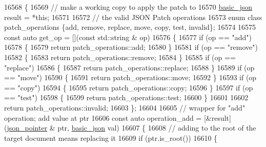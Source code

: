 \begin{DoxyCode}
16568     \{
16569         \textcolor{comment}{// make a working copy to apply the patch to}
16570         \hyperlink{classnlohmann_1_1basic__json_aed115142bd0c6c66c864700e0467df55}{basic\_json} result = *\textcolor{keyword}{this};
16571 
16572         \textcolor{comment}{// the valid JSON Patch operations}
16573         \textcolor{keyword}{enum class} patch\_operations \{add, \textcolor{keyword}{remove}, replace, move, copy, test, invalid\};
16574 
16575         \textcolor{keyword}{const} \textcolor{keyword}{auto} get\_op = [](\textcolor{keyword}{const} std::string & op)
16576         \{
16577             \textcolor{keywordflow}{if} (op == \textcolor{stringliteral}{"add"})
16578             \{
16579                 \textcolor{keywordflow}{return} patch\_operations::add;
16580             \}
16581             \textcolor{keywordflow}{if} (op == \textcolor{stringliteral}{"remove"})
16582             \{
16583                 \textcolor{keywordflow}{return} patch\_operations::remove;
16584             \}
16585             \textcolor{keywordflow}{if} (op == \textcolor{stringliteral}{"replace"})
16586             \{
16587                 \textcolor{keywordflow}{return} patch\_operations::replace;
16588             \}
16589             \textcolor{keywordflow}{if} (op == \textcolor{stringliteral}{"move"})
16590             \{
16591                 \textcolor{keywordflow}{return} patch\_operations::move;
16592             \}
16593             \textcolor{keywordflow}{if} (op == \textcolor{stringliteral}{"copy"})
16594             \{
16595                 \textcolor{keywordflow}{return} patch\_operations::copy;
16596             \}
16597             \textcolor{keywordflow}{if} (op == \textcolor{stringliteral}{"test"})
16598             \{
16599                 \textcolor{keywordflow}{return} patch\_operations::test;
16600             \}
16601 
16602             \textcolor{keywordflow}{return} patch\_operations::invalid;
16603         \};
16604 
16605         \textcolor{comment}{// wrapper for "add" operation; add value at ptr}
16606         \textcolor{keyword}{const} \textcolor{keyword}{auto} operation\_add = [&result](\hyperlink{classnlohmann_1_1basic__json_a6886a5001f5b449ad316101a311ce536}{json\_pointer} & ptr, 
      \hyperlink{classnlohmann_1_1basic__json_aed115142bd0c6c66c864700e0467df55}{basic\_json} val)
16607         \{
16608             \textcolor{comment}{// adding to the root of the target document means replacing it}
16609             \textcolor{keywordflow}{if} (ptr.is\_root())
16610             \{

\end{DoxyCode}
